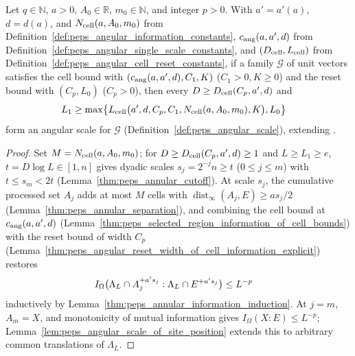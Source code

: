 \begin{lemma}
    \label{thm:peps_angular_information_of_bounds}
    \leanok
    Let $q\in\mathbb N$, $a>0$, $A_0\in\mathbb R$, $m_0\in\mathbb N$, and integer $p>0$. With $a'=a'(a)$, $d=d(a)$, and $N_{\rm cell}(a,A_0,m_0)$ from Definition~\ref{def:peps_angular_information_constants}, $c_{\rm ang}(a,a',d)$ from Definition~\ref{def:peps_angular_single_scale_constants}, and $(D_{\rm cell},L_{\rm cell})$ from Definition~\ref{def:peps_angular_cell_reset_constants}, if a family $\mathcal G$ of unit vectors satisfies the cell bound with $(c_{\rm ang}(a,a',d),C_1,K)$ ($C_1>0,K\ge0$) and the reset bound with $(C_p,L_0)$ ($C_p>0$), then every $D\ge D_{\rm cell}(C_p,a',d)$ and
    \begin{align}
        L_1 & \ge \max\bigl\{L_{\rm cell}\bigl(a',d,C_p,C_1,N_{\rm cell}(a,A_0,m_0),K\bigr),
        L_0\bigr\}
        \label{eq:peps_angular_family_threshold}
    \end{align}
    form an angular scale for $\mathcal G$ (Definition~\ref{def:peps_angular_scale}), extending \cite[Proposition~3.4]{OpenAI2026PolynomialPEPS}.
\end{lemma}
\begin{proof}
    \leanok
    Set $M=N_{\rm cell}(a,A_0,m_0)$; for $D\ge D_{\rm cell}(C_p,a',d)\ge1$ and $L\ge L_1\ge e$, $t=D\log L\in[1,n]$ gives dyadic scales $s_j=2^{-j}n\ge t$ ($0\le j\le m$) with $t\le s_m<2t$ (Lemma~\ref{thm:peps_annular_cutoff}). At scale $s_j$, the cumulative processed set $A_j$ adds at most $M$ cells with $\operatorname{dist}_\infty(A_j,E)\ge as_j/2$ (Lemma~\ref{thm:peps_annular_separation}), and combining the cell bound at $c_{\rm ang}(a,a',d)$ (Lemma~\ref{thm:peps_selected_region_information_of_cell_bounds}) with the reset bound of width $C_p$ (Lemma~\ref{thm:peps_angular_reset_width_of_cell_information_explicit}) restores
    \begin{align}
        I_\Omega\bigl(\Lambda_L\cap A_j^{+a's_j}:
        \Lambda_L\cap E^{+a's_j}\bigr) & \le L^{-p}
        \notag
    \end{align}
    inductively by Lemma~\ref{thm:peps_annular_information_induction}. At $j=m$, $A_m=X$, and monotonicity of mutual information gives $I_\Omega(X:E)\le L^{-p}$; Lemma~\ref{lem:peps_angular_scale_of_site_position} extends this to arbitrary common translations of $\Lambda_L$.
\end{proof}

